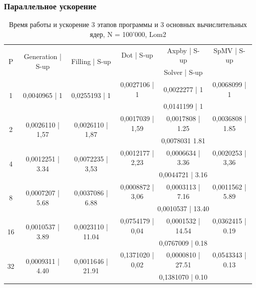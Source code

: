 		\subsubsection{Параллельное ускорение}
		\begin{table}[H]
			\centering
			\begin{tabular}{|c||c|c|c|c|c|}
				\hline
				\multirow{2}{*}{P} &  \multirow{2}{*}{Generation | S-up} & \multirow{2}{*}{Filling | S-up} & Dot | S-up & Axpby | S-up & SpMV | S-up \\ \cline{4-6}
				                   &                              &                         & \multicolumn{3}{c|}{Solver | S-up} \\ \hline
\multirow{2}{*}{1} & \multirow{2}{*}{0,0040965 | 1} & \multirow{2}{*}{0,0255193 | 1} & 0,0027106 | 1 & 0,0022277 | 1 & 0,0068099 | 1 \\ \cline{4-6}
                   &                   &                   & \multicolumn{3}{c|}{0,0141199 | 1}   \\ \hline
\multirow{2}{*}{2} & \multirow{2}{*}{0,0026110 | 1,57} & \multirow{2}{*}{0,0026110 | 1,87} & 0,0017039 | 1,59 & 0,0017808 | 1.25 & 0,0036808 | 1.85\\ \cline{4-6}
                   &                   &                   & \multicolumn{3}{c|}{0,0078031	1.81}   \\ \hline
\multirow{2}{*}{4} & \multirow{2}{*}{0,0012251 | 3.34} & \multirow{2}{*}{0,0072235 | 3,53} & 0,0012177 | 2,23& 0,0006634 | 3.36& 0,0020253 | 3,36\\ \cline{4-6}
                   &                   &                   & \multicolumn{3}{c|}{0,0044721 | 3.16}   \\ \hline
\multirow{2}{*}{8} & \multirow{2}{*}{0,0007207 | 5.68} & \multirow{2}{*}{0,0037086 | 6.88} & 0,0008872 | 3,06& 0,0003113 | 7.16& 0,0011562 | 5.89\\ \cline{4-6}
                   &                   &                   & \multicolumn{3}{c|}{0,0010537 | 13.40}   \\ \hline
\multirow{2}{*}{16} & \multirow{2}{*}{0,0010537 | 3.89} & \multirow{2}{*}{0,0023110 | 11.04} & 0,0754179 | 0,04& 0,0001532 | 14.54& 0,0362415 | 0.19\\ \cline{4-6}
                   &                   &                   & \multicolumn{3}{c|}{0,0767009 | 0.18}   \\ \hline
\multirow{2}{*}{32} & \multirow{2}{*}{0,0009311 | 4.40} & \multirow{2}{*}{0,0011646 | 21.91} & 0,1371020 | 0,02& 0,0000810 | 27.51& 0,0543343 | 0.13\\ \cline{4-6}
                   &                   &                   & \multicolumn{3}{c|}{0,1381070 | 0.10}   \\ \hline

			\end{tabular}
			\caption{Время работы и ускорение 3 этапов программы и 3 основных вычислительных ядер, N = 100'000, Lom2}
			\label{par_1}
		\end{table}
